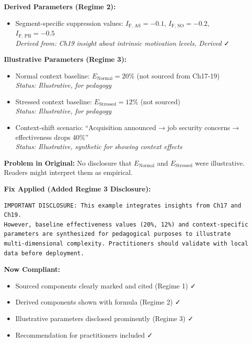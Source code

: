 \textbf{Derived Parameters (Regime 2):}
\begin{itemize}[nosep]
\item Segment-specific suppression values: $I_{\text{F, AS}} = -0.1$, $I_{\text{F, SO}} = -0.2$, $I_{\text{F, PB}} = -0.5$
\\ \textit{Derived from: Ch19 insight about intrinsic motivation levels, Derived} ✓
\end{itemize}

\textbf{Illustrative Parameters (Regime 3):}
\begin{itemize}[nosep]
\item Normal context baseline: $E_{\text{Normal}} = 20\%$ (not sourced from Ch17-19)
\\ \textit{Status: Illustrative, for pedagogy}
\item Stressed context baseline: $E_{\text{Stressed}} = 12\%$ (not sourced)
\\ \textit{Status: Illustrative, for pedagogy}
\item Context-shift scenario: ``Acquisition announced → job security concerns → effectiveness drops 40\%''
\\ \textit{Status: Illustrative, synthetic for showing context effects}
\end{itemize}

\textbf{Problem in Original:} No disclosure that $E_{\text{Normal}}$ and $E_{\text{Stressed}}$ were illustrative. Readers might interpret them as empirical.

\textbf{Fix Applied (Added Regime 3 Disclosure):}
\begin{verbatim}
IMPORTANT DISCLOSURE: This example integrates insights from Ch17 and Ch19.
However, baseline effectiveness values (20%, 12%) and context-specific
parameters are synthesized for pedagogical purposes to illustrate
multi-dimensional complexity. Practitioners should validate with local
data before deployment.
\end{verbatim}

\textbf{Now Compliant:}
\begin{itemize}[nosep]
\item Sourced components clearly marked and cited (Regime 1) ✓
\item Derived components shown with formula (Regime 2) ✓
\item Illustrative parameters disclosed prominently (Regime 3) ✓
\item Recommendation for practitioners included ✓
\end{itemize}

